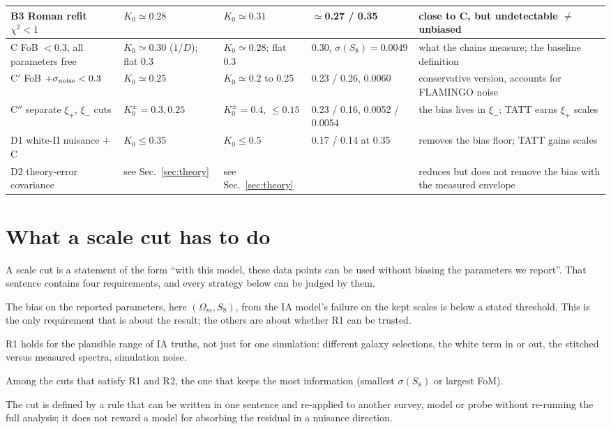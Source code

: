 \documentclass[11pt]{article}
\begin{document}
\begin{table}[H]
{\begin{tabular}{p{4.6cm}p{2.7cm}p{2.7cm}p{2.5cm}p{5.2cm}}
B3 Roman refit $\chi^2 < 1$ & $K_0 \simeq 0.28$ & $K_0 \simeq 0.31$ & $\simeq$0.27 / 0.35 & close to C, but undetectable $\neq$ unbiased \\
\midrule
C FoB $<0.3$, all parameters free & $K_0 \simeq 0.30$ ($1/D$); flat 0.3 & $K_0 \simeq 0.28$; flat 0.3 & 0.30, $\sigma(S_8)=0.0049$ & what the chains measure; the baseline definition \\
C$'$ FoB $+ \sigma_{\rm noise} < 0.3$ & $K_0 \simeq 0.25$ & $K_0 \simeq 0.2$ to 0.25 & 0.23 / 0.26, 0.0060 & conservative version, accounts for FLAMINGO noise \\
C$''$ separate $\xi_+$, $\xi_-$ cuts & $K_0^\pm = 0.3, 0.25$ & $K_0^\pm = 0.4$, $\le0.15$ & 0.23 / 0.16, 0.0052 / 0.0054 & the bias lives in $\xi_-$; TATT earns $\xi_+$ scales \\
\midrule
D1 white-II nuisance $+$ C & $K_0 \le 0.35$ & $K_0 \le 0.5$ & 0.17 / 0.14 at 0.35 & removes the bias floor; TATT gains scales \\
D2 theory-error covariance & see Sec.~\ref{sec:theory} & see Sec.~\ref{sec:theory} & & reduces but does not remove the bias with the measured envelope \\
\bottomrule
\end{tabular}}
\end{table}

\section{What a scale cut has to do}\label{sec:req}

A scale cut is a statement of the form ``with this model, these data points
can be used without biasing the parameters we report''. That sentence
contains four requirements, and every strategy below can be judged by them.

\begin{description}[leftmargin=1.2em,itemsep=2pt]
\item[R1 Accuracy.] The bias on the reported parameters, here $(\Omega_m,
  S_8)$, from the IA model's failure on the kept scales is below a stated
  threshold. This is the only requirement that is about the result; the
  others are about whether R1 can be trusted.
\item[R2 Robustness.] R1 holds for the plausible range of IA truths, not
  just for one simulation: different galaxy selections, the white term in or
  out, the stitched versus measured spectra, simulation noise.
\item[R3 Efficiency.] Among the cuts that satisfy R1 and R2, the one that
  keeps the most information (smallest $\sigma(S_8)$ or largest FoM).
\item[R4 Transparency.] The cut is defined by a rule that can be written in
  one sentence and re-applied to another survey, model or probe without
  re-running the full analysis; it does not reward a model for absorbing
  the residual in a nuisance direction.
\end{description}
\end{document}

